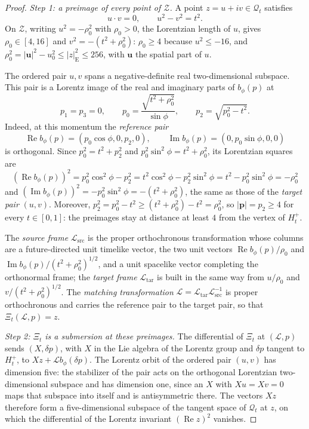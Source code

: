 \documentclass[11pt]{amsart}
\numberwithin{equation}{section}
\theoremstyle{definition}
\newcommand{\bp}{\mathbf p}
\newcommand{\Rea}{\operatorname{Re}}
\newcommand{\Ima}{\operatorname{Im}}
\begin{document}
\begin{proof}
\emph{Step 1: a preimage of every point of \(\mathscr Z\).}
A point \(z=u+iv\in\mathcal Q_t\) satisfies
\[
 u\cdot v=0,\qquad u^2-v^2=t^2.
\]
On \(\mathscr Z\), writing \(u^2=-\rho_0^2\) with \(\rho_0>0\), the
Lorentzian length of \(u\), gives \(\rho_0\in[4,16]\) and \(v^2=-(t^2+\rho_0^2)\):
\(\rho_0\ge4\) because \(u^2\le-16\), and
\(\rho_0^2=|\mathbf u|^2-u_0^2\le|z|_{\mathrm E}^2\le256\), with \(\mathbf u\) the
spatial part of \(u\).

The ordered pair \(u,v\) spans a negative-definite real
two-dimensional subspace. This pair is a Lorentz image of the real and
imaginary parts of \(b_\phi(p)\) at
\[
 p_1=p_3=0,\qquad
 p_0=\frac{\sqrt{t^2+\rho_0^2}}{\sin\phi},\qquad
 p_2=\sqrt{p_0^2-t^2}.
\]
Indeed, at this momentum the \emph{reference pair}
\[
 \Rea b_\phi(p)=(p_0\cos\phi,0,p_2,0),\qquad
 \Ima b_\phi(p)=(0,p_0\sin\phi,0,0)
\]
is orthogonal. Since \(p_0^2=t^2+p_2^2\) and
\(p_0^2\sin^2\phi=t^2+\rho_0^2\), its Lorentzian squares are
\[
 (\Rea b_\phi(p))^2=p_0^2\cos^2\phi-p_2^2
 =t^2\cos^2\phi-p_2^2\sin^2\phi
 =t^2-p_0^2\sin^2\phi=-\rho_0^2
\]
and \((\Ima b_\phi(p))^2=-p_0^2\sin^2\phi=-(t^2+\rho_0^2)\), the same as those
of the \emph{target pair} \((u,v)\). Moreover,
\(p_2^2=p_0^2-t^2\ge(t^2+\rho_0^2)-t^2=\rho_0^2\), so \(|\bp|=p_2\ge4\) for
every \(t\in[0,1]\): the preimages stay at distance at least \(4\) from the
vertex of \(H_t^+\).

The \emph{source frame}
\(\mathcal L_{\mathrm{src}}\) is the proper orthochronous
transformation whose columns are a future-directed unit timelike
vector, the two unit vectors \(\Rea b_\phi(p)/\rho_0\) and
\(\Ima b_\phi(p)/(t^2+\rho_0^2)^{1/2}\), and a unit spacelike vector
completing the orthonormal frame; the \emph{target frame}
\(\mathcal L_{\mathrm{tar}}\) is built in the same way from
\(u/\rho_0\) and \(v/(t^2+\rho_0^2)^{1/2}\). The \emph{matching
transformation}
\(\mathcal L=\mathcal L_{\mathrm{tar}}\mathcal L_{\mathrm{src}}^{-1}\)
is proper orthochronous and carries the reference pair to the target
pair, so that \(\Xi_t(\mathcal L,p)=z\).

\smallskip
\emph{Step 2: \(\Xi_t\) is a submersion at these preimages.} The
differential of \(\Xi_t\) at \((\mathcal L,p)\) sends \((X,\delta p)\), with
\(X\) in the Lie algebra of the Lorentz group and \(\delta p\) tangent to
\(H_t^+\), to \(Xz+\mathcal Lb_\phi(\delta p)\).
The Lorentz orbit of the ordered pair \((u,v)\) has dimension five: the
stabilizer of the pair acts on the orthogonal Lorentzian two-dimensional subspace
and has dimension one, since an \(X\) with \(Xu=Xv=0\) maps that subspace
into itself and is antisymmetric there. The vectors \(Xz\) therefore form
a five-dimensional subspace of the tangent space of \(\mathcal Q_t\) at
\(z\), on which the differential of the Lorentz invariant \((\Rea z)^2\)
vanishes.


\end{proof}
\end{document}
